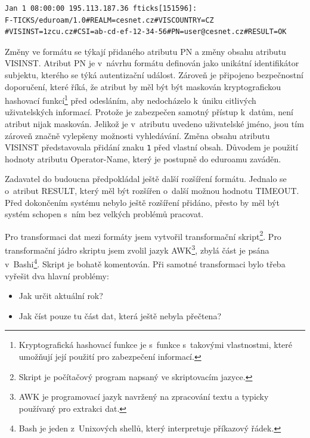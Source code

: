 \documentclass[thesis=M,czech]{FITthesis}[2012/06/26]
\begin{document}
      \begin{verbatim}
Jan 1 08:00:00 195.113.187.36 fticks[151596]: 
F-TICKS/eduroam/1.0#REALM=cesnet.cz#VISCOUNTRY=CZ
#VISINST=1zcu.cz#CSI=ab-cd-ef-12-34-56#PN=user@cesnet.cz#RESULT=OK
      \end{verbatim}

      Změny ve formátu se týkají přidaného atributu PN a změny obsahu atributu VISINST.
      Atribut PN je v~návrhu formátu definován jako unikátní identifikátor subjektu, 
      kterého se týká autentizační událost.
      Zároveň je připojeno bezpečnostní doporučení, které říká, že
      atribut by měl být být maskován kryptografickou hashovací funkcí\footnote{
        Kryptografická hashovací funkce je s~funkce s~takovými vlastnostmi, které umožňují její použití pro zabezpečení informací.
      }
      před odesláním, aby nedocházelo k~úniku citlivých uživatelských informací.
      Protože je zabezpečen samotný přístup k~datům, není atribut nijak maskován.
      Jelikož je v~atributu uvedeno uživatelské jméno, jsou tím zároveň značně vylepšeny možnosti vyhledávání.
      Změna obsahu atributu VISINST představovala přidání znaku \verb|1| před vlastní obsah.
      Důvodem je použití hodnoty atributu Operator-Name, který je postupně do eduroamu zaváděn.\cite{rfc5580}

      Zadavatel do budoucna předpokládal ještě další rozšíření formátu.
      Jednalo se o~atribut RESULT, který měl být rozšířen o~další možnou hodnotu TIMEOUT.
      Před dokončením systému nebylo ještě rozšíření přidáno, 
      přesto by měl být systém schopen s~ním bez velkých problémů pracovat.

      Pro transformaci dat mezi formáty jsem vytvořil transformační skript\footnote{
        Skript je počítačový program napsaný ve skriptovacím jazyce.        
      }.
      Pro transformační jádro skriptu jsem zvolil jazyk AWK\footnote{
        AWK je programovací jazyk navržený na zpracování textu 
        a typicky používaný pro extrakci dat.
      }, zbylá část je psána v~Bashi\footnote{
        Bash je jeden z~Unixových shellů, který interpretuje příkazový řádek.
      }.
      Skript je bohatě komentován.
      Při samotné transformaci bylo třeba vyřešit dva hlavní problémy:
      \begin{itemize}
        \item{Jak určit aktuální rok?}
        \item{Jak číst pouze tu část dat, která ještě nebyla přečtena?}
      \end{itemize}
\end{document}
